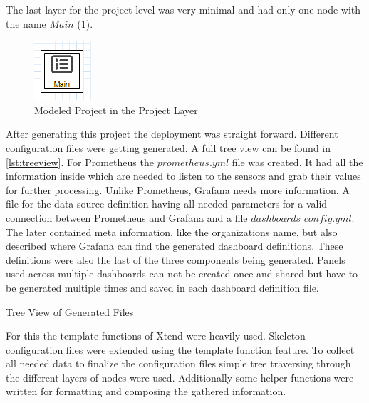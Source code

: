 The last layer for the project level was very minimal and had only one node with the name $Main$ (\cref{fig:modeled_project_layer}).

\begin{figure}[!ht]
	\centering
	\includegraphics{assets/images/projectLayer}
	\caption{Modeled Project in the Project Layer}
	\label{fig:modeled_project_layer}
\end{figure}

After generating this project the  deployment was straight forward. Different configuration files were getting generated. A full tree view can be found in \cref{lst:treeview}. For Prometheus the $prometheus.yml$ file was created. It had all the information inside which are needed to listen to the sensors and grab their values for further processing. Unlike Prometheus, Grafana needs more information. A file for the data source definition having all needed parameters for a valid connection between Prometheus and Grafana and a file $dashboards\_config.yml$. The later contained meta information, like the organizations name, but also described where Grafana can find the generated dashboard definitions. These definitions were also the last of the three components being generated. Panels used across multiple dashboards can not be created once and shared but have to be generated multiple times and saved in each dashboard definition file.

\begin{listing}[!ht]
	\setlength{\DTbaselineskip}{20pt}
	\caption{Tree View of Generated Files}
	\label{lst:treeview}
\end{listing}

For this the template functions of Xtend were heavily used. Skeleton configuration files were extended using the template function feature. To collect all needed data to finalize the configuration files simple tree traversing through the different layers of nodes were used. Additionally some helper functions were written for formatting and composing the gathered information. 

